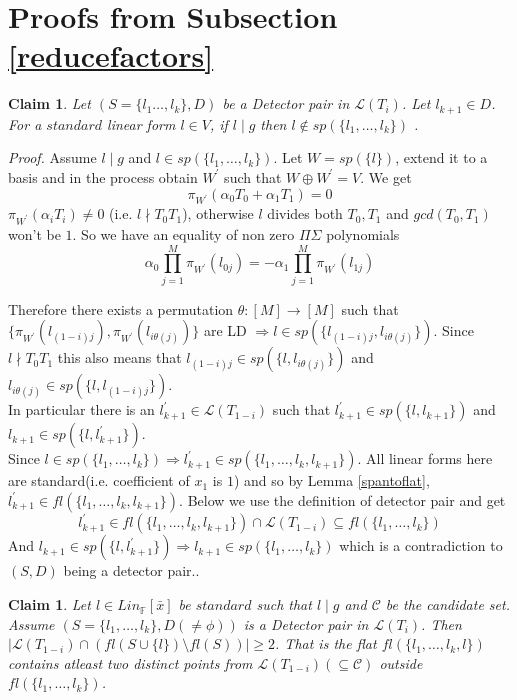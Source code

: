 \documentclass[letterpaper,USenglish,numberwithinsect]{lipics}
\newcommand{\F}{\mathbb{F}}
\newcommand{\ML}{\mathcal{L}}
\newcommand{\MC}{\mathcal{C}}
\newcommand{\B}[1]{\bar{#1}}
\newtheorem{claim}[theorem]{Claim}
\begin{document}
\section{Proofs from Subsection \ref{reducefactors}}


\begin{claim} \label{spuriousliproof}
Let $(S = \{l_{1}\ldots, l_{k}\},D)$ be a Detector pair in $\ML(T_i)$. Let
$l_{k+1}\in D$. For a $standard$ linear form $l\in V$, if $l\mid g$ then
$l\notin sp(\{l_{1},\ldots,l_{k}\})$ .
\end{claim}
\emph{Proof.}
Assume $l\mid g$ and $l\in sp(\{l_{1},\ldots,l_{k}\})$. Let $W = sp(\{l\})$,
extend it to a basis and in the process obtain $W^\prime$ such that $W\oplus
W^\prime = V$. We get
\[
\pi_{W^\prime}(\alpha_0T_0 + \alpha_1T_1) =0
\]
$\pi_{W^\prime}(\alpha_iT_i)\neq 0$ (i.e. $l\nmid T_0T_1$), otherwise $l$ divides both $T_0,T_1$ and
$gcd(T_0,T_1)$ won't be $1$. So we have an equality of non zero $\Pi\Sigma$
polynomials
\[
 \alpha_0\prod\limits_{j=1}^M\pi_{W^\prime}(l_{0j}) =
-\alpha_1\prod\limits_{j=1}^M\pi_{W^\prime}(l_{1j})
\]

Therefore there
exists a permutation $\theta : [M] \rightarrow [M]$  such that
$\{\pi_{W^\prime}(l_{(1-i)j}), \pi_{W^\prime}(l_{i\theta(j)})\}$ are LD
$\Rightarrow l\in sp(\{l_{(1-i)j}, l_{i\theta(j)} \})$. Since $l\nmid T_0T_1$
this also means that $l_{(1-i)j}\in sp(\{l,l_{i\theta(j)}\})$ and $l_{i\theta(j)}\in sp(\{l,l_{(1-i)j}\})$.\\

In particular there is
an $l_{k+1}^\prime\in \ML(T_{1-i})$ such that $l_{k+1}^\prime\in
sp(\{l,l_{k+1}\})$ and $l_{k+1}\in sp(\{l,l_{k+1}^\prime\})$.\\

  Since $l\in sp(\{l_{1},\ldots,l_{k}\})\Rightarrow l_{k+1}^\prime\in
sp(\{l_{1},\ldots,l_{k},l_{k+1}\})$. All linear forms here are standard(i.e. coefficient of $x_1$ is $1$)
  and so by Lemma \ref{spantoflat}, $l_{k+1}^\prime \in fl(\{l_1,\ldots,l_k,l_{k+1}\})$. Below we use
  the definition of detector pair and get
  \[
  l_{k+1}^\prime\in fl(\{l_{1},\ldots,l_{k},l_{k+1}\})\cap \ML(T_{1-i})\subseteq
fl(\{l_{1},\ldots,l_{k}\})
  \]
  And $l_{k+1}\in sp(\{l,l_{k+1}^\prime\})\Rightarrow l_{k+1}\in
sp(\{l_1,\ldots,l_k\})$ which is a contradiction to $(S,D)$ being a detector pair..




\begin{claim}\label{spuriousextraproof}
Let $l \in Lin_\F[\B{x}]$ be $standard$ such that $l \mid g$ and
$\MC$ be the candidate set. Assume $(S = \{l_{1},\ldots,l_{k}\}, D(\neq \phi))$
is a Detector pair in $\ML(T_i)$. Then $|\ML(T_{1-i}) \cap (fl(S\cup\{l\}) \setminus
fl(S))|\geq 2$. That is the flat $fl(\{l_{1},\ldots,l_{k},l\})$ contains
atleast two distinct points from $\ML(T_{1-i})(\subseteq \MC)$ outside $fl(\{l_1,\ldots,l_k\})$.
\end{claim}
\end{document}
